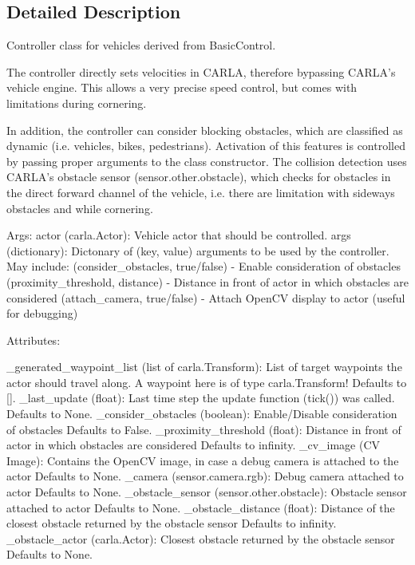 \subsection{Detailed Description}
\begin{DoxyVerb}Controller class for vehicles derived from BasicControl.

The controller directly sets velocities in CARLA, therefore bypassing
CARLA's vehicle engine. This allows a very precise speed control, but comes
with limitations during cornering.

In addition, the controller can consider blocking obstacles, which are
classified as dynamic (i.e. vehicles, bikes, pedestrians). Activation of this
features is controlled by passing proper arguments to the class constructor.
The collision detection uses CARLA's obstacle sensor (sensor.other.obstacle),
which checks for obstacles in the direct forward channel of the vehicle, i.e.
there are limitation with sideways obstacles and while cornering.

Args:
    actor (carla.Actor): Vehicle actor that should be controlled.
    args (dictionary): Dictonary of (key, value) arguments to be used by the controller.
                       May include: (consider_obstacles, true/false) - Enable consideration of obstacles
                                    (proximity_threshold, distance)  - Distance in front of actor in which
                                                                       obstacles are considered
                                    (attach_camera, true/false)      - Attach OpenCV display to actor
                                                                       (useful for debugging)

Attributes:

    _generated_waypoint_list (list of carla.Transform): List of target waypoints the actor
        should travel along. A waypoint here is of type carla.Transform!
        Defaults to [].
    _last_update (float): Last time step the update function (tick()) was called.
        Defaults to None.
    _consider_obstacles (boolean): Enable/Disable consideration of obstacles
        Defaults to False.
    _proximity_threshold (float): Distance in front of actor in which obstacles are considered
        Defaults to infinity.
    _cv_image (CV Image): Contains the OpenCV image, in case a debug camera is attached to the actor
        Defaults to None.
    _camera (sensor.camera.rgb): Debug camera attached to actor
        Defaults to None.
    _obstacle_sensor (sensor.other.obstacle): Obstacle sensor attached to actor
        Defaults to None.
    _obstacle_distance (float): Distance of the closest obstacle returned by the obstacle sensor
        Defaults to infinity.
    _obstacle_actor (carla.Actor): Closest obstacle returned by the obstacle sensor
        Defaults to None.
\end{DoxyVerb}
 

